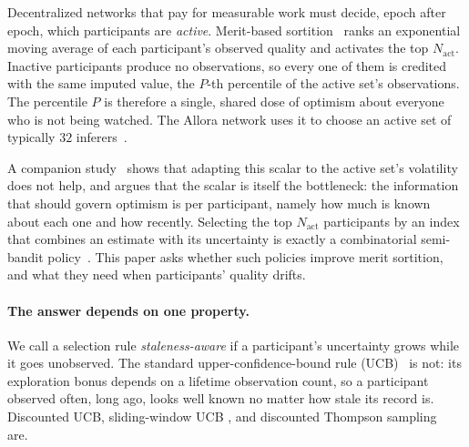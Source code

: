 \documentclass[sigconf,anonymous,review,nonacm]{acmart}
\begin{document}
Decentralized networks that pay for measurable work must decide, epoch after epoch, which
participants are \emph{active}. Merit-based sortition~\cite{kruijssen2024} ranks an
exponential moving average of each participant's observed quality and activates the top
$N_{\mathrm{act}}$. Inactive participants produce no observations, so every one of them is
credited with the same imputed value, the $P$-th percentile of the active set's
observations. The percentile $P$ is therefore a single, shared dose of optimism about
everyone who is not being watched. The Allora network uses it to choose an active set of
typically $32$ inferers~\cite{pfeffer2025context}.

A companion study~\cite{companionA} shows that adapting this scalar to the active set's
volatility does not help, and argues that the scalar is itself the bottleneck: the
information that should govern optimism is per participant, namely how much is known about
each one and how recently. Selecting the top $N_{\mathrm{act}}$ participants by an index
that combines an estimate with its uncertainty is exactly a combinatorial semi-bandit
policy~\cite{chen2013combinatorial,kveton2015tight}. This paper asks whether such policies
improve merit sortition, and what they need when participants' quality drifts.

\paragraph{The answer depends on one property.} We call a selection rule
\emph{staleness-aware} if a participant's uncertainty grows while it goes unobserved. The
standard upper-confidence-bound rule (UCB)~\cite{auer2002finite} is not: its exploration
bonus depends on a lifetime observation count, so a participant observed often, long ago,
looks well known no matter how stale its record is. Discounted UCB, sliding-window UCB
\cite{garivier2011switching}, and discounted Thompson sampling~\cite{raj2017taming} are.
\end{document}
